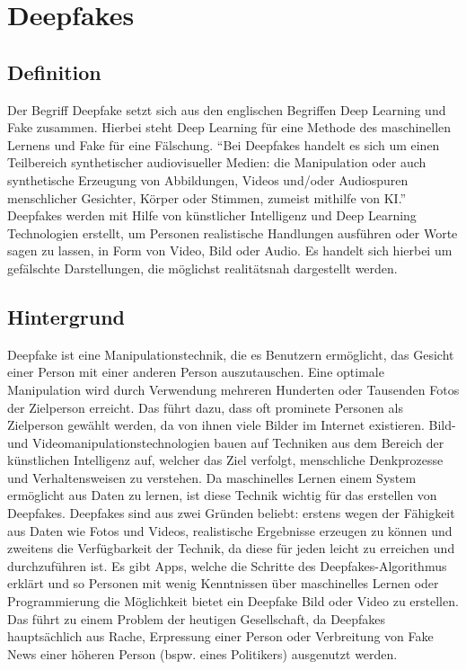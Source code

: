 \section{Deepfakes}
\subsection{Definition}
Der Begriff Deepfake setzt sich aus den englischen Begriffen Deep Learning und Fake zusammen. Hierbei steht Deep Learning für eine Methode des maschinellen Lernens und Fake für eine Fälschung.\newline
``Bei Deepfakes handelt es sich um einen Teilbereich synthetischer audiovisueller Medien: die Manipulation oder auch synthetische Erzeugung von Abbildungen, Videos und/oder Audiospuren menschlicher Gesichter, Körper oder Stimmen, zumeist mithilfe von KI.''\cite{SpringerLink}
\cite{SpringerLink}
\newline
Deepfakes werden mit Hilfe von künstlicher Intelligenz und Deep Learning Technologien erstellt, um Personen realistische Handlungen ausführen oder Worte sagen zu lassen, in Form von Video, Bild oder Audio. Es handelt sich hierbei um gefälschte Darstellungen, die möglichst realitätsnah dargestellt werden.\cite{ScienceDirect}

\subsection{Hintergrund}
Deepfake ist eine Manipulationstechnik, die es Benutzern ermöglicht, das Gesicht einer Person mit einer anderen Person auszutauschen. Eine optimale Manipulation wird durch Verwendung mehreren Hunderten oder Tausenden Fotos der Zielperson erreicht. Das führt dazu, dass oft prominete Personen als Zielperson gewählt werden, da von ihnen viele Bilder im Internet existieren.\newline
Bild- und Videomanipulationstechnologien bauen auf Techniken aus dem Bereich der künstlichen Intelligenz auf, welcher das Ziel verfolgt, menschliche Denkprozesse und Verhaltensweisen zu verstehen.
Da maschinelles Lernen einem System ermöglicht aus Daten zu lernen, ist diese Technik wichtig für das erstellen von Deepfakes. \newline
Deepfakes sind aus zwei Gründen beliebt: erstens wegen der Fähigkeit aus Daten wie Fotos und Videos, realistische Ergebnisse erzeugen zu können und zweitens die Verfügbarkeit der Technik, da diese für jeden leicht zu erreichen und durchzuführen ist.
Es gibt Apps, welche die Schritte des Deepfakes-Algorithmus erklärt und so Personen mit wenig Kenntnissen über maschinelles Lernen oder Programmierung die Möglichkeit bietet ein Deepfake Bild oder Video zu erstellen. \newline
Das führt zu einem Problem der heutigen Gesellschaft, da Deepfakes hauptsächlich aus Rache, Erpressung einer Person oder Verbreitung von Fake News einer höheren Person (bspw. eines Politikers) ausgenutzt werden.\cite{Jatit}


